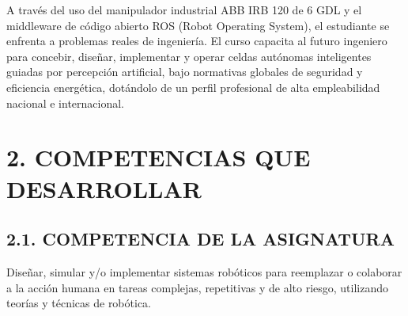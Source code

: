 \documentclass[11pt, letterpaper]{article}
\begin{document}
A través del uso del manipulador industrial ABB IRB 120 de 6 GDL y el middleware de código abierto ROS (Robot Operating System), el estudiante se enfrenta a problemas reales de ingeniería. El curso capacita al futuro ingeniero para concebir, diseñar, implementar y operar celdas autónomas inteligentes guiadas por percepción artificial, bajo normativas globales de seguridad y eficiencia energética, dotándolo de un perfil profesional de alta empleabilidad nacional e internacional.

\section*{2. COMPETENCIAS QUE DESARROLLAR}
\subsection*{2.1. COMPETENCIA DE LA ASIGNATURA}

Diseñar, simular y/o implementar sistemas robóticos para reemplazar o colaborar a la acción humana en tareas complejas, repetitivas y de alto riesgo, utilizando teorías y técnicas de robótica.
\end{document}
